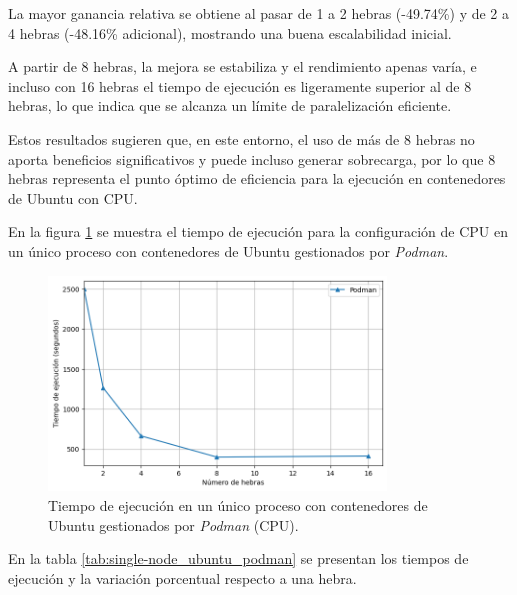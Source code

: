 La mayor ganancia relativa se obtiene al pasar de 1 a 2 hebras (-49.74\%) y de 2 a 4 hebras (-48.16\% adicional), mostrando una buena escalabilidad inicial.

A partir de 8 hebras, la mejora se estabiliza y el rendimiento apenas varía, e incluso con 16 hebras el tiempo de ejecución es ligeramente superior al de 8 hebras, lo que indica que se alcanza un límite de paralelización eficiente.

Estos resultados sugieren que, en este entorno, el uso de más de 8 hebras no aporta beneficios significativos y puede incluso generar sobrecarga, por lo que 8 hebras representa el punto óptimo de eficiencia para la ejecución en contenedores de Ubuntu con CPU.

En la figura \ref{fig:single-node_ubuntu_podman_time} se muestra el tiempo de ejecución para la configuración de CPU en un único proceso con contenedores de Ubuntu gestionados por \textit{Podman}.

\begin{figure}[H]
    \centering
    \includegraphics[width=0.8\textwidth]{imagenes/cap5/single-node_ubuntu_podman_time.png}
    \caption{Tiempo de ejecución en un único proceso con contenedores de Ubuntu gestionados por \textit{Podman} (CPU).}
    \label{fig:single-node_ubuntu_podman_time}
\end{figure}

En la tabla \ref{tab:single-node_ubuntu_podman} se presentan los tiempos de ejecución y la variación porcentual respecto a una hebra.

